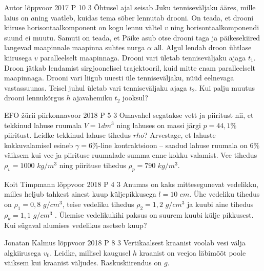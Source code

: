 \documentclass[11pt]{article}
\begin{document}
{%
{Autor} %
{lõppvoor} %
{2017} %
{P 10} %
{3} %
{
\ifStatement
Õhtusel ajal seisab Juku tenniseväljaku ääres, mille laius on $a $ning vaatleb, kuidas tema sõber lennutab drooni. On teada, et drooni kiiruse horisontaalkomponent on kogu lennu vältel $v$ ning horisontaalkomponendi suund ei muutu. Samuti on teada, et Päike asub otse drooni taga ja päikesekiired langevad maapinnale maapinna suhtes nurga $\alpha$ all. Algul lendab droon ühtlase kiirusega $v$ paralleelselt maapinnaga. Drooni vari ületab tenniseväljaku ajaga $t_1$. Droon jätkab lendamist sirgjoonelisel trajektooril, kuid mitte enam paralleelselt maapinnaga. Drooni vari liigub uuesti üle tenniseväljaku, nüüd eelnevaga vastassuunas. Teisel juhul ületab vari tenniseväljaku ajaga $t_2$. Kui palju muutus drooni lennukõrgus $h$ ajavahemiku $t_2$ jooksul?
\fi
}

{EFO žürii} %
{piirkonnavoor} %
{2018} %
{P 5} %
{3} %
{
\ifStatement
Omavahel segatakse vett ja piiritust nii, et tekkinud lahuse ruumala $V = 1 dm^3$ ning lahuses on massi järgi $p = 44,1\%$ piiritust. Leidke tekkinud lahuse tihedus $rho$? Arvestage, et lahuste kokkuvalamisel esineb $\gamma = 6 \%$-line kontraktsioon – saadud lahuse ruumala on $6 \%$ väiksem kui vee ja piirituse ruumalade summa enne kokku valamist. Vee tihedus $\rho_v = 1000$ $kg/m^3$ ning piirituse tihedus $\rho_p = 790$ $kg/m^3$.
\fi
}

{Koit Timpmann} %
{lõppvoor} %
{2018} %
{P 4} %
{3} %
{
\ifStatement
Anumas on kaks mittesegunevat vedelikku, milles heljub tahkest ainest kuup küljepikkusega $l = 10$ $cm$. Ühe vedeliku tihedus on $\rho_1 = 0,8$ $g/cm^3$, teise vedeliku tihedus $\rho_2 = 1,2$ $g/cm^3$ ja kuubi aine tihedus $\rho_k = 1,1$ $g/cm^3$ . Ülemise vedelikukihi paksus on suurem kuubi külje pikkusest. Kui sügaval alumises vedelikus asetseb kuup?
\fi
}


{Jonatan Kalmus} %
{lõppvoor} %
{2018} %
{P 8} %
{3} %
{
\ifStatement
Vertikaalsest kraanist voolab vesi välja algkiirusega $v_0$. Leidke, millisel kaugusel $h$ kraanist on veejoa läbimõõt poole väiksem kui kraanist väljudes. Raskuskiirendus on $g$.
\fi
}

}
\end{document}
